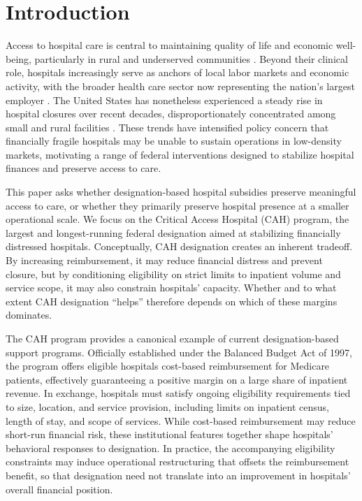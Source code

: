 \documentclass[a4paper, 12pt, twoside]{article}
\begin{document}
\clearpage

\setcounter{page}{2}


\section{Introduction} 
\label{sec:introduction}
Access to hospital care is central to maintaining quality of life and economic well-being, particularly in rural and underserved communities \citep{ziedan2022}. Beyond their clinical role, hospitals increasingly serve as anchors of local labor markets and economic activity, with the broader health care sector now representing the nation’s largest employer \citep{alexander2023}. The United States has nonetheless experienced a steady rise in hospital closures over recent decades, disproportionately concentrated among small and rural facilities \citep{kaufman2016, medpac2021}. These trends have intensified policy concern that financially fragile hospitals may be unable to sustain operations in low-density markets, motivating a range of federal interventions designed to stabilize hospital finances and preserve access to care.

This paper asks whether designation-based hospital subsidies preserve meaningful access to care, or whether they primarily preserve hospital presence at a smaller operational scale. We focus on the Critical Access Hospital (CAH) program, the largest and longest-running federal designation aimed at stabilizing financially distressed hospitals. Conceptually, CAH designation creates an inherent tradeoff. By increasing reimbursement, it may reduce financial distress and prevent closure, but by conditioning eligibility on strict limits to inpatient volume and service scope, it may also constrain hospitals’ capacity. Whether and to what extent CAH designation ``helps'' therefore depends on which of these margins dominates.

The CAH program provides a canonical example of current designation-based support programs. Officially established under the Balanced Budget Act of 1997, the program offers eligible hospitals cost-based reimbursement for Medicare patients, effectively guaranteeing a positive margin on a large share of inpatient revenue. In exchange, hospitals must satisfy ongoing eligibility requirements tied to size, location, and service provision, including limits on inpatient census, length of stay, and scope of services. While cost-based reimbursement may reduce short-run financial risk, these institutional features together shape hospitals' behavioral responses to designation. In practice, the accompanying eligibility constraints may induce operational restructuring that offsets the reimbursement benefit, so that designation need not translate into an improvement in hospitals' overall financial position.
\end{document}
